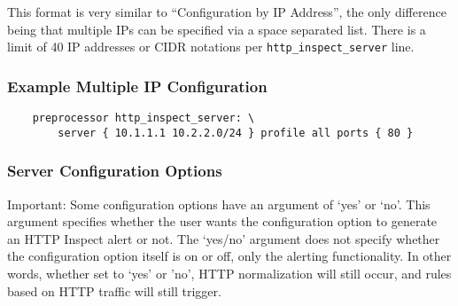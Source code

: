 \documentclass[english]{report}
\begin{document}
This format is very similar to ``Configuration by IP Address'', the only
difference being that multiple IPs can be specified via a space separated list.
There is a limit of 40 IP addresses or CIDR notations per
\texttt{http\_inspect\_server} line.

\subsubsection{Example Multiple IP Configuration}

\begin{verbatim}
    preprocessor http_inspect_server: \
        server { 10.1.1.1 10.2.2.0/24 } profile all ports { 80 }
\end{verbatim}

\subsubsection{Server Configuration Options}

Important: Some configuration options have an argument of `yes' or `no'.  This
argument specifies whether the user wants the configuration option to generate
an HTTP Inspect alert or not.  The `yes/no' argument does not specify whether
the configuration option itself is on or off, only the alerting functionality.
In other words, whether set to `yes' or 'no', HTTP normalization will still
occur, and rules based on HTTP traffic will still trigger.
\end{document}
